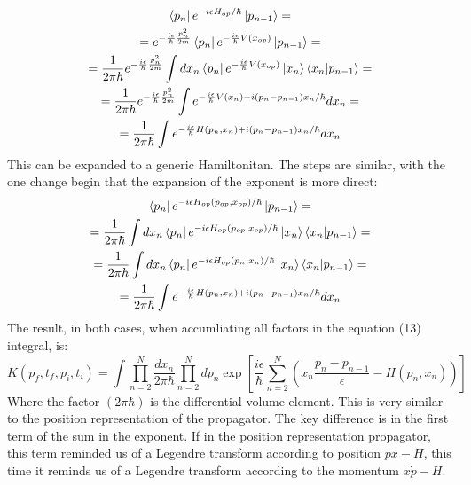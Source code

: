 \documentclass{article}
\begin{document}
\begin{equation}
\begin{gathered}
    \bra{p_n} e^{-i \epsilon H_{op} / \hbar} \ket{p_{n-1}} = 
    \\
    = e^{-\frac{i\epsilon}{\hbar}\frac{p_n^2}{2m}} \bra{p_n} e^{-\frac{i\epsilon}{\hbar}V(x_{op})} \ket{p_{n-1}} =
    \\
    = \frac{1}{2\pi\hbar} e^{-\frac{i\epsilon}{\hbar}\frac{p_n^2}{2m}} \int dx_n \bra{p_n} e^{-\frac{i\epsilon}{\hbar}V(x_{op})} \ket{x_n} \bra{x_n} \ket{p_{n-1}} =
    \\
    = \frac{1}{2\pi\hbar} e^{-\frac{i\epsilon}{\hbar}\frac{p_n^2}{2m}} \int e^{-\frac{i\epsilon}{\hbar}V(x_n)- i(p_n - p_{n-1})x_n/\hbar} dx_n =
    \\
    = \frac{1}{2\pi\hbar}\int e^{-\frac{i\epsilon}{\hbar}H(p_n, x_n) + i(p_n - p_{n-1})x_n/\hbar}dx_n
\end{gathered}
\end{equation}
This can be expanded to a generic Hamiltonitan. The steps are similar, with the one change begin that the expansion of the exponent is more direct:
\begin{equation}
\begin{gathered}
    \bra{p_n} e^{-i \epsilon H_{op}(p_{op}, x_{op}) / \hbar} \ket{p_{n-1}} = 
    \\
    = \frac{1}{2\pi\hbar} \int dx_n \bra{p_n} e^{-i \epsilon H_{op}(p_{op}, x_{op}) / \hbar} \ket{x_n} \bra{x_n} \ket{p_{n-1}} =
    \\
    = \frac{1}{2\pi\hbar} \int dx_n \bra{p_n} e^{-i \epsilon H_{op}(p_n, x_n) / \hbar} \ket{x_n} \bra{x_n} \ket{p_{n-1}} =
    \\
    = \frac{1}{2\pi\hbar}\int e^{-\frac{i\epsilon}{\hbar}H(p_n, x_n) + i(p_n - p_{n-1})x_n/\hbar}dx_n
\end{gathered}
\end{equation}
The result, in both cases, when accumliating all factors in the equation (13) integral, is:
\begin{equation}
    K(p_f, t_f, p_i, t_i) = \int \prod_{n=2}^{N} \frac{dx_n}{2\pi\hbar} \prod_{n=2}^{N} dp_n \exp \left[
        \frac{i\epsilon}{\hbar}
        \sum_{n=2}^{N}
        \left(
            x_n \frac{p_n - p_{n-1}}{\epsilon} - H(p_n, x_n)
        \right)
    \right]
\end{equation}
Where the factor $(2\pi\hbar)$ is the differential volume element. This is very similar to the position representation of the propagator. The key difference is in the first term of the sum in the exponent. If in the position representation propagator, this term reminded us of a Legendre transform according to position $p\dot{x} - H$, this time it reminds us of a Legendre transform according to the momentum $x\dot{p} - H$.
\end{document}
